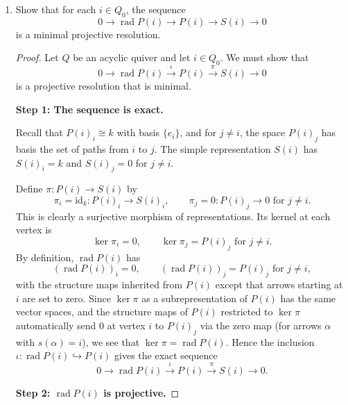 \documentclass[11pt, a4paper]{article}
\begin{document}
\begin{enumerate}[leftmargin=*, label=\textbf{\arabic*.}]
\begin{proof}
    These are precisely the minimal projective resolutions of the simple representations.
    \end{proof}

\item Show that for each $i \in Q_0$, the sequence
\[
0 \longrightarrow \operatorname{rad} P(i) \longrightarrow P(i) \longrightarrow S(i) \longrightarrow 0
\]
is a minimal projective resolution.

\begin{proof}
    Let $Q$ be an acyclic quiver and let $i\in Q_0$. We must show that
    \[
    0 \longrightarrow \operatorname{rad} P(i) \xrightarrow{\;\iota\;} P(i) \xrightarrow{\;\pi\;} S(i) \longrightarrow 0
    \]
    is a projective resolution that is minimal.
    
    \medskip\noindent\textbf{Step 1: The sequence is exact.}
    
    Recall that $P(i)_i\cong k$ with basis $\{e_i\}$, and for $j\neq i$, the space $P(i)_j$ has basis the set of paths from $i$ to $j$. The simple representation $S(i)$ has $S(i)_i=k$ and $S(i)_j=0$ for $j\neq i$.

    Define $\pi\colon P(i)\to S(i)$ by
    \[
    \pi_i=\mathrm{id}_k\colon P(i)_i\to S(i)_i,\qquad \pi_j=0\colon P(i)_j\to 0 \text{ for } j\neq i.
    \]
    This is clearly a surjective morphism of representations. Its kernel at each vertex is
    \[
    \ker\pi_i=0,\qquad \ker\pi_j=P(i)_j \text{ for } j\neq i.
    \]
    By definition, $\operatorname{rad}P(i)$ has
    \[
    (\operatorname{rad}P(i))_i=0,\qquad (\operatorname{rad}P(i))_j=P(i)_j \text{ for } j\neq i,
    \]
    with the structure maps inherited from $P(i)$ except that arrows starting at $i$ are set to zero. Since $\ker\pi$ as a subrepresentation of $P(i)$ has the same vector spaces, and the structure maps of $P(i)$ restricted to $\ker\pi$ automatically send $0$ at vertex $i$ to $P(i)_j$ via the zero map (for arrows $\alpha$ with $s(\alpha)=i$), we see that $\ker\pi=\operatorname{rad}P(i)$. Hence the inclusion $\iota\colon\operatorname{rad}P(i)\hookrightarrow P(i)$ gives the exact sequence
    \[
    0 \longrightarrow \operatorname{rad} P(i) \xrightarrow{\;\iota\;} P(i) \xrightarrow{\;\pi\;} S(i) \longrightarrow 0.
    \]

    \medskip\noindent\textbf{Step 2: $\operatorname{rad}P(i)$ is projective.}
    

\end{proof}
\end{enumerate}
\end{document}
